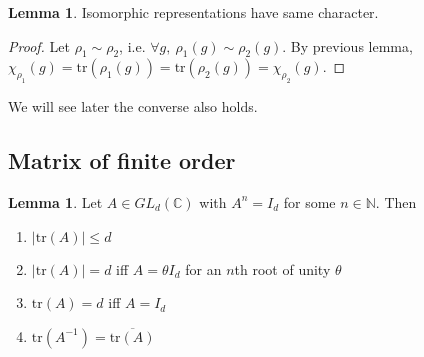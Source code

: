 \documentclass{article}
\newcommand{\tr}{\text{tr}}
\newcommand{\N}{\mathbb{N}}
\newcommand{\C}{\mathbb{C}}
\theoremstyle{definition}
\newtheorem{lemma}[defn]{Lemma}
\begin{document}
\begin{lemma}
\label{lemma:isorepcharsame}
Isomorphic representations have same character.
\end{lemma}
\begin{proof}
Let $\rho_1\sim\rho_2$, i.e. $\forall g,\ \rho_1(g)\sim\rho_2(g)$. By previous lemma, $\chi_{\rho_1}(g)=\tr(\rho_1(g))=\tr(\rho_2(g))=\chi_{\rho_2}(g)$.
\end{proof}
We will see later the converse also holds.

\subsection{Matrix of finite order}
\begin{lemma}
\label{lemma:traceoffinordmat}
Let $A\in GL_d(\C)$ with $A^n=I_d$ for some $n\in\N$. Then
\begin{enumerate}
\item $|\tr(A)|\leq d$
\item $|\tr(A)|=d$ iff $A=\theta I_d$ for an $n$th root of unity $\theta$
\item $\tr(A)=d$ iff $A=I_d$
\item $\tr\left(A^{-1}\right)=\overline{\tr(A)}$
\end{enumerate}
\end{lemma}
\end{document}
